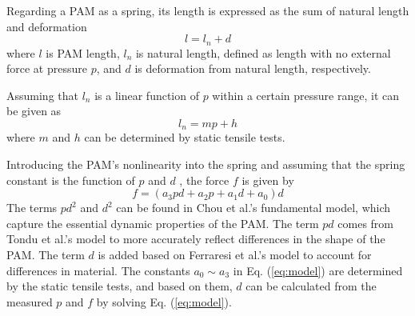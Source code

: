 Regarding a PAM as a spring\cite{spring}, its length is expressed as the sum of natural length and deformation
\begin{equation}
   l = l_n + d
\label{eq:estimation}
\end{equation}
where $l$ is PAM length, $l_n$ is natural length, defined as length with no external force at pressure $p$, and $d$ is deformation from natural length, respectively.
 
Assuming that $l_n$ is a linear function of $p$ within a certain pressure range, it can be given as
\begin{equation}
l_n = mp + h
\label{eq:L_n}
\end{equation}
where $m$ and $h$ can be determined by static tensile tests.
 
Introducing the PAM's nonlinearity into the spring and assuming that the spring constant is the function of $p$ and $d$ \cite{spring}, the force $f$ is given by
\begin{equation}
\label{eq:model}
f = (a_3pd + a_2p + a_1d + a_0)d
\end{equation}
The terms $pd^2$ and $d^2$ can be found in Chou et al.'s fundamental model\cite{chouMeasurementModelingMcKibben1996}, which capture the essential dynamic properties of the PAM. The term $pd$  comes from Tondu et al.'s model\cite{ModelingControl} to more accurately reflect differences in the shape of the PAM. The term $d$ is added based on Ferraresi et al.'s model\cite{Comparison} to account for differences in material. The constants $a_0 \sim a_3$ in Eq. (\ref{eq:model}) are determined by the static tensile tests, and based on them, $d$  can be calculated from the measured $p$ and $f$ by solving Eq. (\ref{eq:model}).
